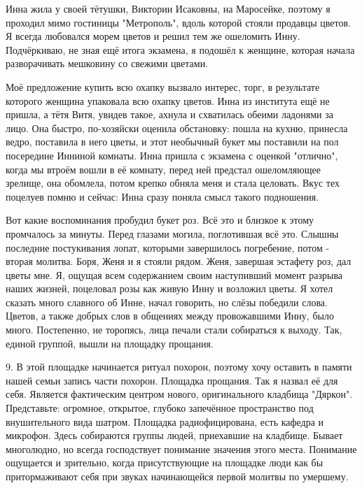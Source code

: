 \label{292-2}
Инна жила у своей тётушки, Виктории Исаковны, на Маросейке, поэтому я проходил мимо гостиницы "Метрополь", вдоль которой стояли продавцы цветов. Я всегда любовался морем цветов и решил тем же ошеломить Инну. Подчёркиваю, не зная ещё итога экзамена, я подошёл к женщине, которая начала разворачивать мешковину со свежими цветами.

\label{293-1}
Моё предложение купить всю охапку вызвало интерес, торг, в результате которого женщина упаковала всю охапку цветов. Инна из института ещё не пришла, а тётя Витя, увидев такое, ахнула и схватилась обеими ладонями за лицо. Она быстро, по-хозяйски оценила обстановку: пошла на кухню, принесла ведро, поставила в него цветы, и этот необычный букет мы поставили на пол посередине Инниной комнаты. Инна пришла с экзамена с оценкой "отлично", когда мы втроём вошли в её комнату, перед ней предстал ошеломляющее зрелище, она обомлела, потом крепко обняла меня и стала целовать. Вкус тех поцелуев помню и сейчас: Инна сразу поняла смысл такого подношения.

\label{294-1}
Вот какие воспоминания пробудил букет роз. Всё это и близкое к этому промчалось за минуты. Перед глазами могила, поглотившая всё это. Слышны последние постукивания лопат, которыми завершилось погребение, потом - вторая молитва. Боря, Женя и я стояли рядом. Женя, завершая эстафету роз, дал цветы мне. Я, ощущая всем содержанием своим наступивший момент разрыва наших жизней, поцеловал розы как живую Инну и возложил цветы. Я хотел сказать много славного об Инне, начал говорить, но слёзы победили слова. Цветов, а также добрых слов в общениях между провожавшими Инну, было много. Постепенно, не торопясь, лица печали стали собираться к выходу. Так, единой группой, вышли на площадку прощания.

\label{295-1}
9.
В этой площадке начинается ритуал похорон, поэтому хочу оставить в памяти нашей семьи запись части похорон. Площадка прощания. Так я назвал её для себя. Является фактическим центром нового, оригинального кладбища "Дяркон". Представьте: огромное, открытое, глубоко запечённое пространство под внушительного вида шатром. Площадка радиофицирована, есть кафедра и микрофон. Здесь собираются группы людей, приехавшие на кладбище. Бывает многолюдно, но всегда господствует понимание значения этого места. Понимание ощущается и зрительно, когда присутствующие на площадке люди как бы притормаживают себя при звуках начинающейся первой молитвы по умершему.

